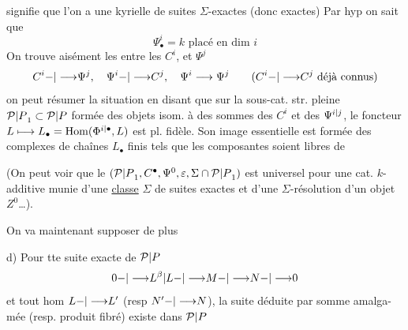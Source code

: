  signifie que l'on a une kyrielle de
suites $\Sigma$-exactes (donc exactes)
Par hyp on sait que
\[
\Psi_\bullet^i=k\text{ placé en dim }i
\]
On trouve aisément les  entre les
$C^i$, et  $\Psi^j$
\[
C^i{-|\longrightarrow}\Psi^j,\quad\Psi^i{-|\longrightarrow}C^j,\quad
\Psi^i\longrightarrow\Psi^j\qquad(C^i{-|\longrightarrow}C^j\text{ déjà connus})
\]
on peut résumer la situation en
disant que sur la sous-cat. str. pleine
${\mathcal P|P}_1\subset{\mathcal P|P}$ formée des objets isom. à des sommes
des $C^i$ et des $\Psi^{{i|j}}$, le foncteur $L\longmapsto L_\bullet=
\operatorname{Hom}(\Phi^{{i|\bullet}},L)$ est pl. fidèle. Son image essentielle
est formée des complexes de chaînes $L_\bullet$
finis tels que les composantes 
 soient libres de 

(On peut voir que le  $({\mathcal P|P}_1,C^\bullet,\Psi^0,\varepsilon,{\Sigma\cap{\mathcal P|P}_1})$
est universel pour une cat. $k$-additive
munie d'une \uline{classe} $\Sigma$ de suites exactes et
d'une $\Sigma$-résolution d'un objet  $Z^0$\ldots).

On va maintenant supposer de plus

d) Pour tte suite \inserted{$\Sigma$-}exacte de ${\mathcal P|P}$
\[
0{-|\longrightarrow}{L^\beta|L}{-|\longrightarrow}M{-|\longrightarrow}N{-|\longrightarrow}0
\]
et tout hom $L{-|\longrightarrow}L'$ (resp $N'{-|\longrightarrow}N$),
la suite  déduite par somme amalga-
mée (resp. produit fibré) existe dans ${\mathcal P|P}$

